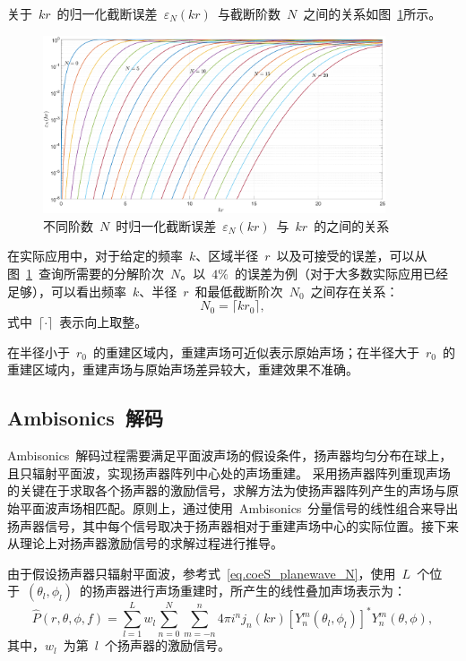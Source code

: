 关于~$kr$~的归一化截断误差~$\varepsilon_N(kr)$~与截断阶数~$N$~之间的关系如图~\ref{Fig:N_kR}所示。

\begin{figure}[H]
\centering
\includegraphics[width=0.9\textwidth]{figure/chapter2/N_kR.eps}
\caption{ 不同阶数~$N$~时归一化截断误差~$\varepsilon _N(kr)$~与~$kr$~的之间的关系}\label{Fig:N_kR}
\label{Fig:N_kR}
\end{figure}

在实际应用中，对于给定的频率~$k$、区域半径~$r$~以及可接受的误差，可以从图~\ref{Fig:N_kR}~查询所需要的分解阶次~$N$。以~$4\%$~的误差为例（对于大多数实际应用已经足够），可以看出频率~$k$、半径~$r$~和最低截断阶次~$N_{0}$~之间存在关系：
\begin{equation}\label{eq.krN}
   N_0=\lceil kr_0 \rceil,
\end{equation}
式中~$\lceil \cdot \rceil$~表示向上取整。

在半径小于~$r_0$~的重建区域内，重建声场可近似表示原始声场；在半径大于~$r_0$~的重建区域内，重建声场与原始声场差异较大，重建效果不准确。


\subsection{Ambisonics~解码}\label{Ambisonics_decoding}

Ambisonics~解码过程需要满足平面波声场的假设条件，扬声器均匀分布在球上，且只辐射平面波，实现扬声器阵列中心处的声场重建。
采用扬声器阵列重现声场的关键在于求取各个扬声器的激励信号，求解方法为使扬声器阵列产生的声场与原始平面波声场相匹配。原则上，通过使用~Ambisonics~分量信号的线性组合来导出扬声器信号，其中每个信号取决于扬声器相对于重建声场中心的实际位置。接下来从理论上对扬声器激励信号的求解过程进行推导。

由于假设扬声器只辐射平面波，参考式~\eqref{eq.coeS_planewave_N}，使用~$L$~个位于~$(\theta_{l},\phi_{l})$~的扬声器进行声场重建时，所产生的线性叠加声场表示为：
\begin{equation}\label{eq.loudspeaker_array}
   \hat{P}(r,\theta,\phi,f)= \sum_{l=1}^{L} w_{l} \sum _{n=0}^{N} \sum _{m=-n}^n 4\pi i^{n} j_n(kr)\left[ Y_n ^m(\theta_{l},\phi_{l}) \right] ^{*} Y_n ^m(\theta,\phi),
\end{equation}
其中，$w_{l}$~为第~$l$~个扬声器的激励信号。

